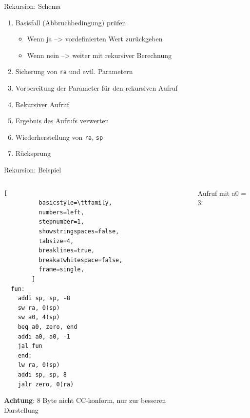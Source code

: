 \documentclass[
  german,            %
  aspectratio=169,    %
]{tumbeamer}
\begin{document}
  \begin{frame}[c, fragile]{Rekursion: Schema}{}
	\begin{enumerate}
	  \item Basisfall (Abbruchbedingung) prüfen
		\begin{itemize}
		  \item Wenn ja --> vordefinierten Wert zurückgeben
		  \item Wenn nein --> weiter mit rekursiver Berechnung
		\end{itemize}
	  \item Sicherung von \verb|ra| und evtl. Parametern
	  \item Vorbereitung der Parameter für den rekursiven Aufruf
	  \item Rekursiver Aufruf
	  \item Ergebnis des Aufrufs verwerten
	  \item Wiederherstellung von \verb|ra|, \verb|sp|
	  \item Rücksprung
	\end{enumerate}
  \end{frame}
  
  \begin{frame}[c, fragile]{Rekursion: Beispiel}{}
	\begin{columns}[c]
	  \begin{column}{0.4\textwidth}
		\begin{lstlisting}[
		  basicstyle=\ttfamily,
		  numbers=left,
		  stepnumber=1,
		  showstringspaces=false,
		  tabsize=4,
		  breaklines=true,
		  breakatwhitespace=false,
		  frame=single,
		]
  fun:
	addi sp, sp, -8
	sw ra, 0(sp)
	sw a0, 4(sp)
	beq a0, zero, end
	addi a0, a0, -1
	jal fun
	end:
	lw ra, 0(sp)
	addi sp, sp, 8
	jalr zero, 0(ra)
		\end{lstlisting}
		\small \textbf{Achtung}: 8 Byte nicht CC-konform, nur zur besseren Darstellung
	  \end{column}
	  \begin{column}{0.5\textwidth}
		Aufruf mit {\ttfamily a0 = 3}:
		\vspace{2cm}
	  \end{column}
	\end{columns}
  \end{frame}
  
\end{document}
